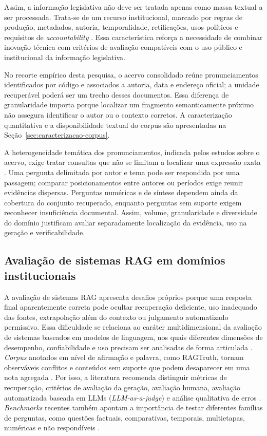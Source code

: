 Assim, a informação legislativa não deve ser tratada apenas como massa textual a ser processada. Trata-se de um recurso institucional, marcado por regras de produção, metadados, autoria, temporalidade, retificações, usos políticos e requisitos de \textit{accountability} \parencite{bandeiraBernardes2016information, martelloteViola2025organizacaoConhecimento}. Essa característica reforça a necessidade de combinar inovação técnica com critérios de avaliação compatíveis com o uso público e institucional da informação legislativa.

No recorte empírico desta pesquisa, o acervo consolidado reúne pronunciamentos identificados por código e associados a autoria, data e endereço oficial; a unidade recuperável poderá ser um trecho desses documentos. Essa diferença de granularidade importa porque localizar um fragmento semanticamente próximo não assegura identificar o autor ou o contexto corretos. A caracterização quantitativa e a disponibilidade textual do corpus são apresentadas na Seção~\ref{sec:caracterizacao-corpus}.

A heterogeneidade temática dos pronunciamentos, indicada pelos estudos sobre o acervo, exige tratar consultas que não se limitam a localizar uma expressão exata \parencite{blanco2025plenarioPalanqueEstudio,blanco2026letrasGraudas}. Uma pergunta delimitada por autor e tema pode ser respondida por uma passagem; comparar posicionamentos entre autores ou períodos exige reunir evidências dispersas. Perguntas numéricas e de síntese dependem ainda da cobertura do conjunto recuperado, enquanto perguntas sem suporte exigem reconhecer insuficiência documental. Assim, volume, granularidade e diversidade do domínio justificam avaliar separadamente localização da evidência, uso na geração e verificabilidade.

\subsection{Avaliação de sistemas RAG em domínios institucionais}

A avaliação de sistemas RAG apresenta desafios próprios porque uma resposta final aparentemente correta pode ocultar recuperação deficiente, uso inadequado das fontes, extrapolação além do contexto ou julgamento automatizado permissivo. Essa dificuldade se relaciona ao caráter multidimensional da avaliação de sistemas baseados em modelos de linguagem, nos quais diferentes dimensões de desempenho, confiabilidade e uso precisam ser analisadas de forma articulada \parencite{liangEtAl2023helm}. \textit{Corpus} anotados em nível de afirmação e palavra, como RAGTruth, tornam observáveis conflitos e conteúdos sem suporte que podem desaparecer em uma nota agregada \parencite{niuEtAl2024ragtruth}. Por isso, a literatura recomenda distinguir métricas de recuperação, critérios de avaliação da geração, avaliação humana, avaliação automatizada baseada em LLMs (\textit{LLM-as-a-judge}) e análise qualitativa de erros \parencite{saadFalconEtAl2024ares,esEtAl2023ragas, pipitoneAlami2024legalbenchRag}. \textit{Benchmarks} recentes também apontam a importância de testar diferentes famílias de perguntas, como questões factuais, comparativas, temporais, multietapas, numéricas e não respondíveis \parencite{zhuEtAl2025rageval}.

